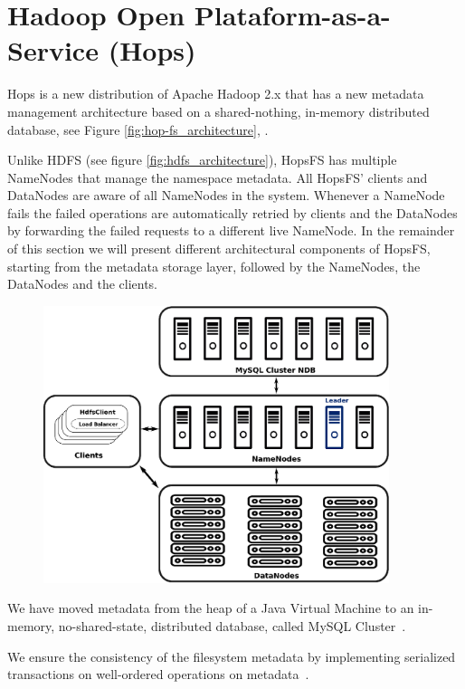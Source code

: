 \section{Hadoop Open Plataform-as-a-Service (Hops)}

Hops is a new distribution of Apache Hadoop 2.x that has a new metadata management architecture based on a shared-nothing, in-memory distributed database, see Figure \ref{fig:hop-fs_architecture}, . 


Unlike HDFS (see figure \ref{fig:hdfs_architecture}), HopsFS has multiple NameNodes that manage the namespace metadata. All HopsFS' clients and DataNodes are aware of all NameNodes in the system. Whenever a NameNode fails the failed operations are automatically retried by clients and the DataNodes by forwarding the failed requests to a different live NameNode. In the remainder of this section we will present different architectural components of HopsFS, starting from the metadata storage layer, followed by the NameNodes, the DataNodes and the clients. 

\begin{figure}[h]
 \centering
 \includegraphics[width=0.9\textwidth]{./imgs/hops-fs-arch.eps}
\end{figure}



We have moved metadata from the heap of a Java Virtual Machine to an in-memory, no-shared-state, distributed database, called MySQL Cluster~\cite{ronstrom2005recovery}. 

We ensure the consistency of the filesystem metadata by implementing serialized transactions on well-ordered operations on metadata~\cite{hops_consistency}.

